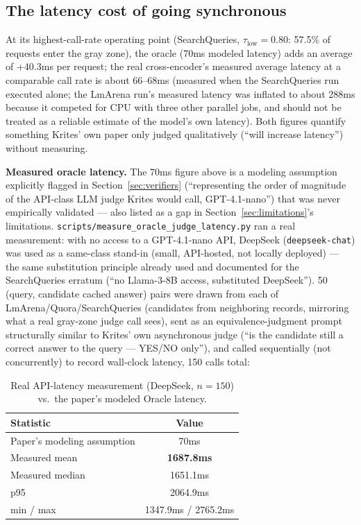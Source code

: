 \documentclass[11pt]{article}
\newcommand{\taulow}{\ensuremath{\tau_{\text{low}}}}
\newenvironment{fittab}{\begin{lrbox}{\fittabbox}}{\end{lrbox}%
  \ifdim\wd\fittabbox>\linewidth\resizebox{\linewidth}{!}{\usebox{\fittabbox}}\else\usebox{\fittabbox}\fi}
\begin{document}
\subsection{The latency cost of going synchronous}
\label{sec:latency}

At its highest-call-rate operating point (SearchQueries, $\taulow=0.80$: 57.5\% of requests enter the gray zone), the oracle (70ms modeled latency) adds an average of +40.3ms per request; the real cross-encoder's measured average latency at a comparable call rate is about 66--68ms (measured when the SearchQueries run executed alone; the LmArena run's measured latency was inflated to about 288ms because it competed for CPU with three other parallel jobs, and should not be treated as a reliable estimate of the model's own latency). Both figures quantify something Krites' own paper only judged qualitatively (``will increase latency'') without measuring.

\textbf{Measured oracle latency.} The 70ms figure above is a modeling assumption explicitly flagged in Section~\ref{sec:verifiers} (``representing the order of magnitude of the API-class LLM judge Krites would call, GPT-4.1-nano'') that was never empirically validated --- also listed as a gap in Section~\ref{sec:limitations}'s limitations. \texttt{scripts/\allowbreak{}measure\_\allowbreak{}oracle\_\allowbreak{}judge\_\allowbreak{}latency.\allowbreak{}py} ran a real measurement: with no access to a GPT-4.1-nano API, DeepSeek (\texttt{deepseek-chat}) was used as a same-class stand-in (small, API-hosted, not locally deployed) --- the same substitution principle already used and documented for the SearchQueries erratum (``no Llama-3-8B access, substituted DeepSeek''). 50 (query, candidate cached answer) pairs were drawn from each of LmArena/Quora/SearchQueries (candidates from neighboring records, mirroring what a real gray-zone judge call sees), sent as an equivalence-judgment prompt structurally similar to Krites' own asynchronous judge (``is the candidate still a correct answer to the query --- YES/NO only''), and called sequentially (not concurrently) to record wall-clock latency, 150 calls total:

\begin{table}[h]
\centering
\small
\begin{fittab}\begin{tabular}{@{}lc@{}}
\toprule
\textbf{Statistic} & \textbf{Value} \\
\midrule
Paper's modeling assumption & 70ms \\
Measured mean & \textbf{1687.8ms} \\
Measured median & 1651.1ms \\
p95 & 2064.9ms \\
min / max & 1347.9ms / 2765.2ms \\
\bottomrule
\end{tabular}\end{fittab}
\caption{Real API-latency measurement (DeepSeek, $n=150$) vs.\ the paper's modeled Oracle latency.}
\end{table}
\end{document}
